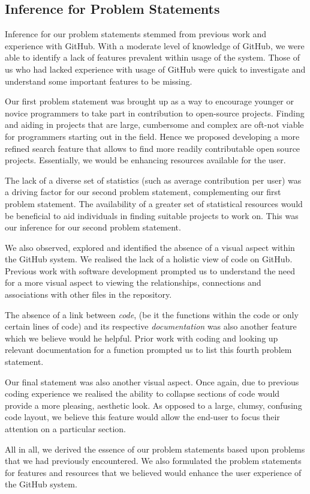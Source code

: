 \documentclass[12pt]{article}
\begin{document}
\subsection{Inference for Problem Statements}
Inference for our problem statements stemmed from previous work and experience with \textsf{GitHub}. With a moderate level of knowledge of \textsf{GitHub}, we were able to identify a lack of features prevalent within usage of the system. Those of us who had lacked experience with usage of \textsf{GitHub} were quick to investigate and understand some important features to be missing.

Our first problem statement was brought up as a way to encourage younger or novice programmers to take part in contribution to open-source projects. Finding and aiding in projects that are large, cumbersome and complex are oft-not viable for programmers starting out in the field. Hence we proposed developing a more refined search feature that allows to find more readily contributable open source projects. Essentially, we would be enhancing resources available for the user.

The lack of a diverse set of statistics (such as average contribution per user) was a driving factor for our second problem statement, complementing our first problem statement. The availability of a greater set of statistical resources would be beneficial to aid individuals in finding suitable projects to work on. This was our inference for our second problem statement.

We also observed, explored and identified the absence of a visual aspect within the \textsf{GitHub} system. We realised the lack of a holistic view of code on \textsf{GitHub}. Previous work with software development prompted us to understand the need for a more visual aspect to viewing the relationships, connections and associations with other files in the repository.

The absence of a link between \textit{code}, (be it the functions within the code or only certain lines of code) and its respective \textit{documentation} was also another feature which we believe would he helpful. Prior work with coding and looking up relevant documentation for a function prompted us to list this fourth problem statement.

Our final statement was also another visual aspect. Once again, due to previous coding experience we realised the ability to collapse sections of code would provide a more pleasing, aesthetic look. As opposed to a large, clumsy, confusing code layout, we believe this feature would allow the end-user to focus their attention on a particular section.

All in all, we derived the essence of our problem statements based upon problems that we had previously encountered. We also formulated the problem statements for features and resources that we believed would enhance the user experience of the \textsf{GitHub} system.
\end{document}
